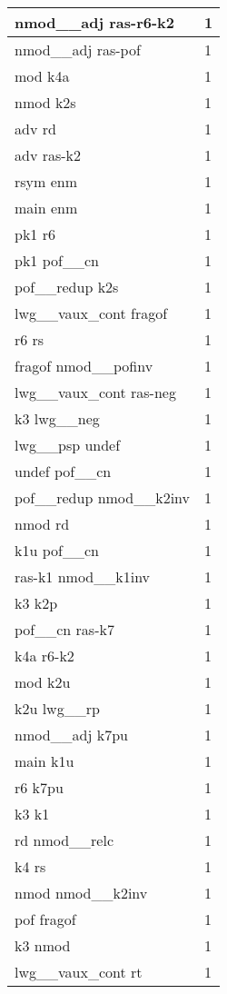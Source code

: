 \documentclass[a4 paper]{article}
\begin{document}
\begin{longtable}{p{}p{}}
nmod\_\_adj ras-r6-k2  & 1 \\ \midrule
nmod\_\_adj ras-pof  & 1 \\ \midrule
mod k4a  & 1 \\ \midrule
nmod k2s  & 1 \\ \midrule
adv rd  & 1 \\ \midrule
adv ras-k2  & 1 \\ \midrule
rsym enm  & 1 \\ \midrule
main enm  & 1 \\ \midrule
pk1 r6  & 1 \\ \midrule
pk1 pof\_\_cn  & 1 \\ \midrule
pof\_\_redup k2s  & 1 \\ \midrule
lwg\_\_vaux\_cont fragof  & 1 \\ \midrule
r6 rs  & 1 \\ \midrule
fragof nmod\_\_pofinv  & 1 \\ \midrule
lwg\_\_vaux\_cont ras-neg  & 1 \\ \midrule
k3 lwg\_\_neg  & 1 \\ \midrule
lwg\_\_psp undef  & 1 \\ \midrule
undef pof\_\_cn  & 1 \\ \midrule
pof\_\_redup nmod\_\_k2inv  & 1 \\ \midrule
nmod rd  & 1 \\ \midrule
k1u pof\_\_cn  & 1 \\ \midrule
ras-k1 nmod\_\_k1inv  & 1 \\ \midrule
k3 k2p  & 1 \\ \midrule
pof\_\_cn ras-k7  & 1 \\ \midrule
k4a r6-k2  & 1 \\ \midrule
mod k2u  & 1 \\ \midrule
k2u lwg\_\_rp  & 1 \\ \midrule
nmod\_\_adj k7pu  & 1 \\ \midrule
main k1u  & 1 \\ \midrule
r6 k7pu  & 1 \\ \midrule
k3 k1  & 1 \\ \midrule
rd nmod\_\_relc  & 1 \\ \midrule
k4 rs  & 1 \\ \midrule
nmod nmod\_\_k2inv  & 1 \\ \midrule
pof fragof  & 1 \\ \midrule
k3 nmod  & 1 \\ \midrule
lwg\_\_vaux\_cont rt  & 1 \\ \midrule

\end{longtable}
\end{document}
